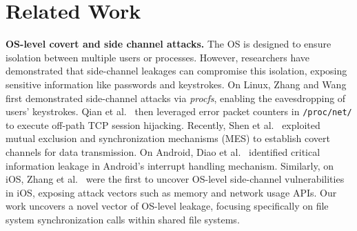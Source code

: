 \section{Related Work}
\label{sec:relatedwork}

\textbf{OS-level covert and side channel attacks.} The OS is designed to ensure isolation between multiple users or processes. However, researchers have demonstrated that side-channel leakages can compromise this isolation, exposing sensitive information like passwords and keystrokes. On Linux, Zhang and Wang~\cite{zhang2009peeping} first demonstrated side-channel attacks via \textit{procfs}, enabling the eavesdropping of users' keystrokes. Qian et al.~\cite{qian2012collaborative} then leveraged error packet counters in \texttt{/proc/net/} to execute off-path TCP session hijacking. Recently, Shen et al.~\cite{shen2023mes} exploited mutual exclusion and synchronization mechanisms (MES) to establish covert channels for data transmission.
On Android, 
Diao et al.~\cite{diao2016no} identified critical information leakage in Android's interrupt handling mechanism. Similarly, on iOS, Zhang et al.~\cite{zhang2018level} were the first to uncover OS-level side-channel vulnerabilities in iOS, exposing attack vectors such as memory and network usage APIs. Our work uncovers a novel vector of OS-level leakage, focusing specifically on file system synchronization calls within shared file systems.

